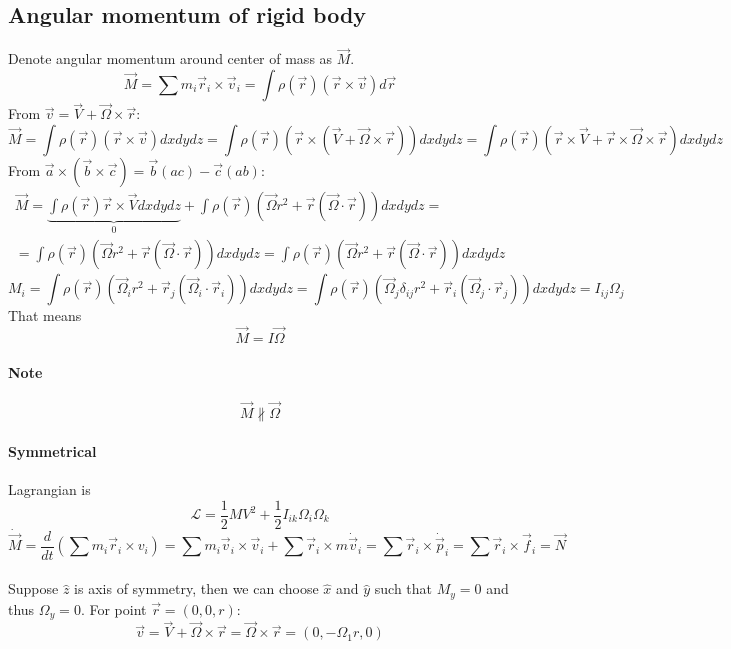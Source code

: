 \subsection{Angular momentum of rigid body}
Denote angular momentum around center of mass as $\vec{M}$.
$$\vec{M} = \sum m_i \vec{r}_i \times \vec{v}_i = \int \rho(\vec{r}) \left( \vec{r} \times \vec{v} \right) d\vec{r}$$
From $\vec{v} = \vec{V} + \vec{\Omega} \times \vec{r}$:
$$\vec{M} = \int \rho(\vec{r}) \left( \vec{r} \times \vec{v} \right) dxdydz = \int \rho(\vec{r}) \left( \vec{r} \times \left(\vec{V} + \vec{\Omega} \times \vec{r}\right) \right) dxdydz  = \int \rho(\vec{r}) \left( \vec{r} \times \vec{V} + \vec{r} \times \vec{\Omega} \times \vec{r}\right) dxdydz $$
From $\vec{a} \times (\vec{b} \times \vec{c}) = \vec{b}(ac) - \vec{c}(ab)$:
\begin{align*}
\vec{M} = \underbrace{\int \rho(\vec{r})  \vec{r} \times \vec{V} dxdydz}_{0} +\int \rho(\vec{r})\left(\vec{\Omega} r^2 + \vec{r} \left(\vec{\Omega} \cdot \vec{r}\right)\right) dxdydz =\\= \int \rho(\vec{r})\left(\vec{\Omega} r^2 + \vec{r} \left(\vec{\Omega} \cdot \vec{r}\right)\right) dxdydz =  \int \rho(\vec{r})\left(\vec{\Omega} r^2 + \vec{r} \left(\vec{\Omega} \cdot \vec{r}\right)\right) dxdydz
\end{align*}
$$M_i =\int \rho(\vec{r})\left(\vec{\Omega}_i r^2 + \vec{r}_j \left(\vec{\Omega}_i \cdot \vec{r}_i\right)\right) dxdydz = \int \rho(\vec{r})\left(\vec{\Omega}_j \delta_{ij} r^2 + \vec{r}_i \left(\vec{\Omega}_j \cdot \vec{r}_j\right)\right) dxdydz = I_{ij} \Omega_j $$
That means
$$\vec{M} = I\vec{\Omega}$$
\paragraph{Note} $$\vec{M} \not\parallel \vec{\Omega}$$
\paragraph{Symmetrical }
Lagrangian is
$$\mathcal{L}  = \frac{1}{2} MV^2 + \frac{1}{2} I_{ik} \Omega_i \Omega_k$$
$$\dot{\vec{M}} = \frac{d}{dt} \left( \sum m_i \vec{r}_i \times v_i \right) = \sum m_i \vec{v}_i \times \vec{v}_i + \sum \vec{r}_i \times m\dot{\vec{v}}_i = \sum \vec{r}_i \times \dot{\vec{p}}_i = \sum \vec{r}_i \times \vec{f}_i = \vec{N} $$

\paragraph{}
Suppose $\hat{z}$ is axis of symmetry, then we can choose $\hat{x}$ and $\hat{y}$ such that $M_y=0$ and thus $\Omega_y = 0$. For point $\vec{r} = (0,0,r)$:
$$\vec{v} = \vec{V} + \vec{\Omega} \times \vec{r} = \vec{\Omega} \times \vec{r}  = (0, -\Omega_1 r, 0)$$